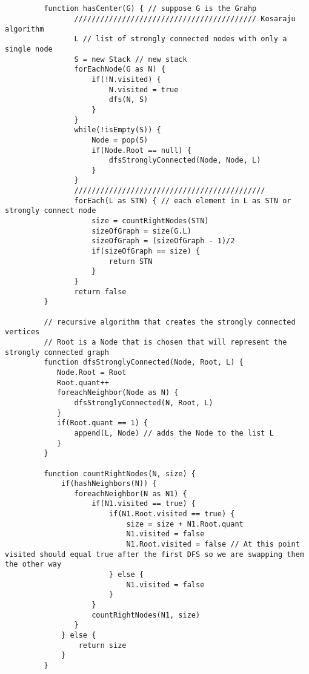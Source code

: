 \documentclass[11pt]{article}
\begin{document}
    \begin{verbatim}
        
         
         function hasCenter(G) { // suppose G is the Grahp
                ////////////////////////////////////////// Kosaraju algorithm
                L // list of strongly connected nodes with only a single node
                S = new Stack // new stack
                forEachNode(G as N) {
                    if(!N.visited) {
                        N.visited = true
                        dfs(N, S)
                    }
                }
                while(!isEmpty(S)) {
                    Node = pop(S)
                    if(Node.Root == null) {
                        dfsStronglyConnected(Node, Node, L)
                    }
                }
                ////////////////////////////////////////////
                forEach(L as STN) { // each element in L as STN or strongly connect node
                    size = countRightNodes(STN)
                    sizeOfGraph = size(G.L)
                    sizeOfGraph = (sizeOfGraph - 1)/2
                    if(sizeOfGraph == size) {
                        return STN
                    }
                }
                return false
         }

         // recursive algorithm that creates the strongly connected vertices
         // Root is a Node that is chosen that will represent the strongly connected graph
         function dfsStronglyConnected(Node, Root, L) { 
            Node.Root = Root
            Root.quant++
            foreachNeighbor(Node as N) {
                dfsStronglyConnected(N, Root, L)
            }
            if(Root.quant == 1) {
                append(L, Node) // adds the Node to the list L
            }
         }
         
         function countRightNodes(N, size) {
             if(hashNeighbors(N)) {
                foreachNeighbor(N as N1) {
                    if(N1.visited == true) {
                        if(N1.Root.visited == true) {
                            size = size + N1.Root.quant
                            N1.visited = false
                            N1.Root.visited = false // At this point visited should equal true after the first DFS so we are swapping them the other way
                        } else {
                            N1.visited = false
                        }
                    } 
                    countRightNodes(N1, size)
                }
             } else {
                 return size
             }
         }


\end{verbatim}
\end{document}
